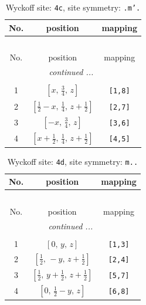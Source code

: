 \documentclass[fleqn,8pt]{jsarticle}
\begin{document}
\renewcommand{\arraystretch}{1.2}
\begin{longtable}{ccc}
\caption{Wyckoff site: {\tt 4c}, site symmetry: {\tt .m'.}}
 \\
 \hline \hline
No. & position & mapping \\ \hline \endfirsthead

\multicolumn{2}{l}{\tablename\ \thetable{}} \\
 \hline \hline
No. & position & mapping \\ \hline \endhead

 \hline \hline
\multicolumn{2}{r}{\footnotesize\it continued ...} \\ \endfoot

 \hline \hline
\multicolumn{2}{r}{} \\ \endlastfoot

1 & $\left[ x,\, \frac{3}{4},\, z \right]$ & {\tt [1,8]} \\ \hline
2 & $\left[ \frac{1}{2} - x,\, \frac{1}{4},\, z + \frac{1}{2} \right]$ & {\tt [2,7]} \\ \hline
3 & $\left[ - x,\, \frac{3}{4},\, z \right]$ & {\tt [3,6]} \\ \hline
4 & $\left[ x + \frac{1}{2},\, \frac{1}{4},\, z + \frac{1}{2} \right]$ & {\tt [4,5]} \\
\end{longtable}
\renewcommand{\arraystretch}{1.2}
\begin{longtable}{ccc}
\caption{Wyckoff site: {\tt 4d}, site symmetry: {\tt m..}}
 \\
 \hline \hline
No. & position & mapping \\ \hline \endfirsthead

\multicolumn{2}{l}{\tablename\ \thetable{}} \\
 \hline \hline
No. & position & mapping \\ \hline \endhead

 \hline \hline
\multicolumn{2}{r}{\footnotesize\it continued ...} \\ \endfoot

 \hline \hline
\multicolumn{2}{r}{} \\ \endlastfoot

1 & $\left[ 0,\, y,\, z \right]$ & {\tt [1,3]} \\ \hline
2 & $\left[ \frac{1}{2},\, - y,\, z + \frac{1}{2} \right]$ & {\tt [2,4]} \\ \hline
3 & $\left[ \frac{1}{2},\, y + \frac{1}{2},\, z + \frac{1}{2} \right]$ & {\tt [5,7]} \\ \hline
4 & $\left[ 0,\, \frac{1}{2} - y,\, z \right]$ & {\tt [6,8]} \\
\end{longtable}
\end{document}
